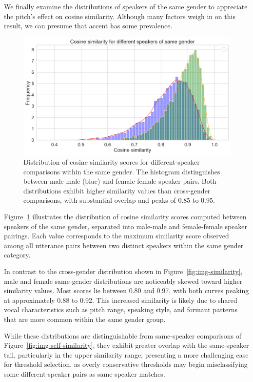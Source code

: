 \documentclass[conference]{IEEEtran}
\begin{document}
	We finally examine the distributions of speakers of the same gender to appreciate the pitch's effect on cosine similarity. Although many factors weigh in on this result, we can presume that accent has some prevalence.
	
	\begin{figure}[H]
		\centering
		\includegraphics[width=1\linewidth]{img/img-similarity-same-gender}
		\caption{Distribution of cosine similarity scores for different-speaker comparisons within the same gender. The histogram distinguishes between male-male (blue) and female-female speaker pairs. Both distributions exhibit higher similarity values than cross-gender comparisons, with substantial overlap and peaks of 0.85 to 0.95.}	
		\label{fig:img-similarity-same-gender}
	\end{figure}
	
	Figure~\ref{fig:img-similarity-same-gender} illustrates the distribution of cosine similarity scores computed between speakers of the same gender, separated into male-male and female-female speaker pairings. Each value corresponds to the maximum similarity score observed among all utterance pairs between two distinct speakers within the same gender category.
	
	In contrast to the cross-gender distribution shown in Figure~\ref{fig:img-similarity}, male and female same-gender distributions are noticeably skewed toward higher similarity values. Most scores lie between 0.80 and 0.97, with both curves peaking at approximately 0.88 to 0.92. This increased similarity is likely due to shared vocal characteristics such as pitch range, speaking style, and formant patterns that are more common within the same gender group.
	
	While these distributions are distinguishable from same-speaker comparisons of Figure~\ref{fig:img-self-similarity}, they exhibit greater overlap with the same-speaker tail, particularly in the upper similarity range, presenting a more challenging case for threshold selection, as overly conservative thresholds may begin misclassifying some different-speaker pairs as same-speaker matches.
	
\end{document}
